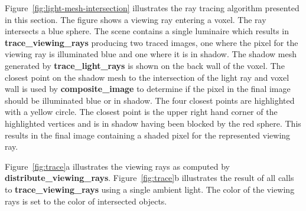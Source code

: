 Figure~\ref{fig:light-mesh-intersection} illustrates the ray tracing algorithm
presented in this section.  The figure shows a viewing ray entering a voxel.  
The ray intersects a blue sphere.  The scene contains a single luminaire 
which results in \textbf{trace\_viewing\_rays} producing two traced images, one 
where the pixel for the viewing ray is illuminated blue and one where it is 
in shadow.  The shadow mesh generated by \textbf{trace\_light\_rays} is shown on 
the back wall of the voxel.   The closest point on the shadow mesh to the 
intersection of the light ray and voxel wall is used by 
\textbf{composite\_image} to determine if the pixel in the final image should be 
illuminated blue or in shadow.  The four closest points are highlighted with 
a yellow circle.  The closest point is the upper right hand corner of the 
highlighted vertices and is in shadow having been blocked by the red sphere.  
This results in the final image containing a shaded pixel for the represented 
viewing ray.

Figure~\ref{fig:trace}a illustrates the viewing rays as computed by
\textbf{distribute\_viewing\_rays}.  Figure~\ref{fig:trace}b illustrates the
result of all calls to \textbf{trace\_viewing\_rays} using a single ambient
light. The color of the viewing rays is set to the color of intersected objects.

